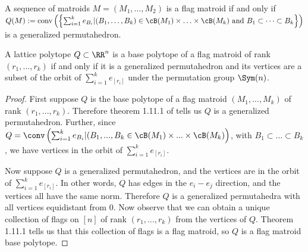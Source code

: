 \begin{theorem}
	\cite[Theorem 1.11.1]{BorovikGelfandWhite:2003} A sequence of matroids $M=(M_{1},\ldots,M_{2})$ is a flag matroid if and only if $Q(M):=\text{conv}\left(\left\{\sum^{k}_{i=1}e_{B_{i}}|(B_{1},\ldots,B_{k})\in\cB(M_{1})\times \ldots \times\cB(M_{k})\text{ and } B_{1}\subset\dots\subset B_{k}\right\}\right)$ is a generalized permutahedron.
\end{theorem}


\begin{theorem}\cite[Theorem 4.1.5]{BrandtEurZhang:2021}
	A lattice polytope $Q\subset\RR^{n}$ is a base polytope of a flag matroid of rank $(r_{1},...,r_{k})$ if and only if it is a generalized permutahedron and its vertices are a subset of the orbit of $\sum^{k}_{i=1}e_{[r_{i}]}$ under the permutation group $\Sym(n)$.
\end{theorem}

\begin{proof}
	First suppose $Q$ is the base polytope of a flag matroid $(M_{1},...,M_{k})$ of rank $(r_{1},...,r_{k})$.
	Therefore theorem 1.11.1 of \cite{BorovikGelfandWhite:2003} tells us $Q$ is a generalized permutahedron.
	Further, since $Q=\conv\left(\sum^{k}_{i=1}e_{B_{i}}|(B_{1},...,B_{k}\in\cB(M_{1})\times...\times\cB(M_{k})\right)$, with $B_{1}\subset...\subset B_{k}$, we have vertices in the orbit of $\sum^{k}_{i=1}e_{[r_{i}]}$. 
	
	
	Now suppose $Q$ is a generalized permutahedron, and the vertices are in the orbit of  $\sum^{k}_{i=1}e_{[r_{i}]}$. In other words, $Q$ has edges in the $e_{i}-e_{j}$ direction, and the vertices all have the same norm. Therefore $Q$ is a generalized permutahedra with all vertices equidistant from $0$. Now observe that we can obtain a unique collection of flags on $[n]$ of rank $(r_{1},...,r_{k})$ from the vertices of $Q$. Theorem 1.11.1 tells us that this collection of flags is a flag matroid, so $Q$ is a flag matroid base polytope.
\end{proof}

